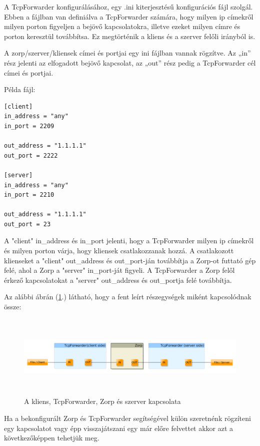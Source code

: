 \documentclass[a4paper,12pt,oneside]{report}
\begin{document}
A TcpForwarder konfigurálásához, egy .ini kiterjesztésű konfigurációs fájl szolgál.
Ebben a fájlban van definiálva a TcpForwarder számára, hogy milyen ip címekről milyen porton figyeljen a bejövő kapcsolatokra, illetve ezeket milyen címre és porton keresztül továbbítsa. Ez megtörténik a kliens és a szerver felőli irányból is.

A zorp/szerver/kliensek címei és portjai egy ini fájlban vannak rögzítve.
Az „in” rész jelenti az elfogadott bejövő kapcsolat, az „out” rész pedig a
TcpForwarder cél címei és portjai.

Példa fájl:
\begin{lstlisting}
[client]
in_address = "any"
in_port = 2209

out_address = "1.1.1.1"
out_port = 2222

[server]
in_address = "any"
in_port = 2210

out_address = "1.1.1.1"
out_port = 23
\end{lstlisting}

A "client" in\_address és in\_port jelenti, hogy a TcpForwarder milyen ip címekről és milyen porton várja, hogy kliensek csatlakozzanak hozzá.
A csatlakozott klienseket a "client" out\_address és out\_port-ján továbbítja a Zorp-ot futtató gép felé, ahol a Zorp a "server" in\_port-ját figyeli.
A TcpForwarder a Zorp felől érkező kapcsolatokat a "server" out\_address és out\_portja felé továbbítja.

Az alábbi ábrán (\ref{fig:streams}.) látható, hogy a fent leírt részegységek miként kapcsolódnak össze:
\begin{center}
\begin{figure}[h]
  \includegraphics[width=1.15\textwidth,height=4cm]{streams.png}
  \caption{A kliens, TcpForwarder, Zorp és szerver kapcsolata}
  \label{fig:streams}
\end{figure}
\end{center}
\newpage
Ha a bekonfigurált Zorp és TcpForwarder segítségével külön szeretnénk rögzíteni egy kapcsolatot vagy épp visszajátszani egy már előre felvettet akkor azt a következőképpen tehetjük meg.
\end{document}

